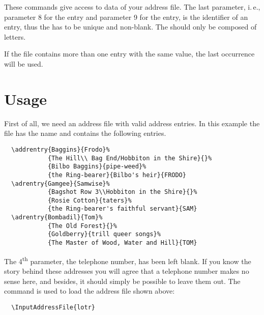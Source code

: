 These commands give access to data of your address file.  The last
parameter, i.\,e., parameter 8 for the  entry and
parameter 9 for the  entry, is the identifier of an
entry, thus the  has to be unique and non-blank. The
 should only be composed of letters.

If the file contains more than one entry with the same 
value, the last occurrence will be used.


%
%
%
%
%

\section{Usage}\label{sec:scraddr.usage}

First of all, we need an address file with valid address entries.  In
this example the file has the name  and contains the
following entries.
\begin{lstlisting}
  \addrentry{Baggins}{Frodo}%
            {The Hill\\ Bag End/Hobbiton in the Shire}{}%
            {Bilbo Baggins}{pipe-weed}%
            {the Ring-bearer}{Bilbo's heir}{FRODO}
  \adrentry{Gamgee}{Samwise}%
            {Bagshot Row 3\\Hobbiton in the Shire}{}%
            {Rosie Cotton}{taters}%
            {the Ring-bearer's faithful servant}{SAM}
  \adrentry{Bombadil}{Tom}%
            {The Old Forest}{}%
            {Goldberry}{trill queer songs}%
            {The Master of Wood, Water and Hill}{TOM}
\end{lstlisting}

The 4\textsuperscript{th} parameter, the telephone number, has been
left blank. If you know the story behind these addresses you will
agree that a telephone number makes no sense here, and besides, it
should simply be possible to leave them out. The command
 is used to load the address file shown above:
\begin{lstlisting}
  \InputAddressFile{lotr}
\end{lstlisting}


